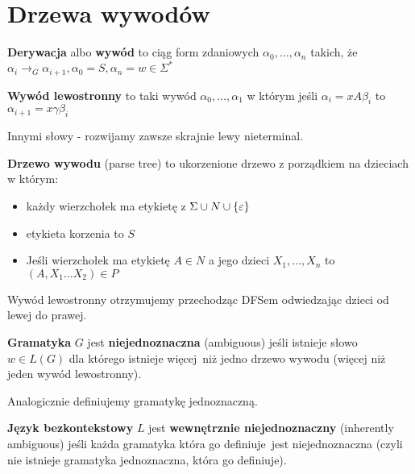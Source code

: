 \section{Drzewa wywodów}

\begin{definition}
	\textbf{Derywacja} albo \textbf{wywód} to ciąg form zdaniowych \( \alpha_0, \dots, \alpha_n \)
	takich, że \( \alpha_i \rightarrow_G \alpha_{i+1}, \alpha_0 = S, \alpha_n = w \in \Sigma^*\)
\end{definition}
\begin{definition}
	\textbf{Wywód lewostronny} to taki wywód \( \alpha_0, \dots, \alpha_1 \)
	w którym jeśli \( \alpha_i = xA\beta_i \)
	to \( \alpha_{i+1} = x\gamma\beta_i \)

	Innymi słowy - rozwijamy zawsze skrajnie lewy nieterminal.
\end{definition}

\begin{definition}
	\textbf{Drzewo wywodu} (parse tree) to ukorzenione drzewo z porządkiem na dzieciach w którym:
	\begin{itemize}
		\item każdy wierzchołek ma etykietę z \( \Sigma \cup N \cup \set{\eps} \)
		\item etykieta korzenia to \( S \)
		\item Jeśli wierzchołek ma etykietę \( A \in N \) a jego dzieci \( X_1, \dots, X_n \) to \( (A, X_1\dots X_2) \in P \)
	\end{itemize}
\end{definition}
Wywód lewostronny otrzymujemy przechodząc DFSem odwiedzając dzieci od lewej do prawej.

\begin{definition}
	\textbf{Gramatyka} \( G \) jest \textbf{niejednoznaczna} (ambiguous) jeśli istnieje słowo \( w \in L(G) \) dla którego istnieje więcej\
	niż jedno drzewo wywodu (więcej niż jeden wywód lewostronny).
\end{definition}

Analogicznie definiujemy gramatykę jednoznaczną.

\begin{definition}
	\textbf{Język bezkontekstowy} \(L\) jest \textbf{wewnętrznie niejednoznaczny} (inherently ambiguous) jeśli każda gramatyka która go definiuje\
	jest niejednoznaczna (czyli nie istnieje gramatyka jednoznaczna, która go definiuje).
\end{definition}